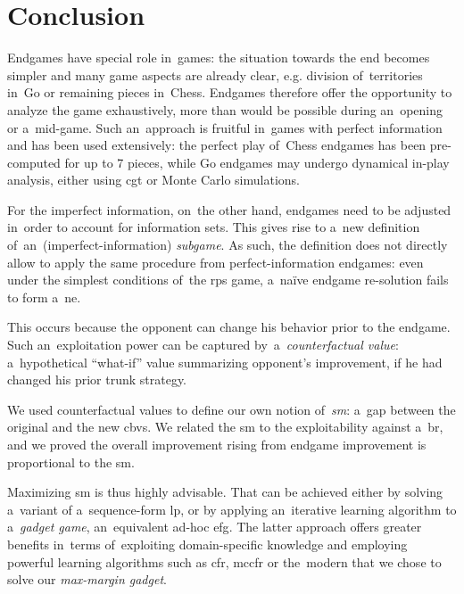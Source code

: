 \chapter*{Conclusion}
Endgames have special role in~games:
the situation towards the end becomes simpler and many game aspects are already clear, e.g. division of~territories in~Go or remaining pieces in~Chess.
Endgames therefore offer the opportunity to analyze the game exhaustively, more than would be possible during an~opening or a~mid-game.
Such an~approach is fruitful in~games with perfect information and has been used extensively:
the perfect play of~Chess endgames has been pre-computed for up to 7 pieces, while Go endgames may undergo dynamical in-play analysis, either using \acrlong{cgt} or Monte Carlo simulations.

For the imperfect information, on~the other hand, endgames need to be adjusted in~order to account for information sets.
This gives rise to a~new definition of~an~(imperfect-information) \emph{subgame}.
As such, the definition does not directly allow to apply the same procedure from perfect-information endgames:
even under the simplest conditions of~the \acrlong{rps} game, a~na{\"i}ve endgame re-solution fails to form a~\acrlong{ne}.

This occurs because the opponent can change his behavior prior to the endgame.
Such an~exploitation power can be captured by~a~\emph{counterfactual value}:
a~hypothetical ``what-if'' value summarizing opponent's improvement, if he had changed his prior trunk strategy.

We used counterfactual values to define our own notion of~\emph{\acrlong{sm}}:
a~gap between the original and the new \acrlong{cbv}s.
We related the \acrshort{sm} to the exploitability against a~\acrlong{br}, and we proved the overall improvement rising from endgame improvement is proportional to the \acrshort{sm}.

Maximizing \acrshort{sm} is thus highly advisable.
That can be achieved either by solving a~variant of a~sequence-form \acrlong{lp}, or by applying an~iterative learning algorithm to a~\emph{gadget game}, an~equivalent ad-hoc \acrlong{efg}.
The latter approach offers greater benefits in~terms of~exploiting domain-specific knowledge and employing powerful learning algorithms such as \acrshort{cfr}, \acrshort{mccfr} or the~modern \cfrplus{} that we chose to solve our \emph{max-margin gadget}.


